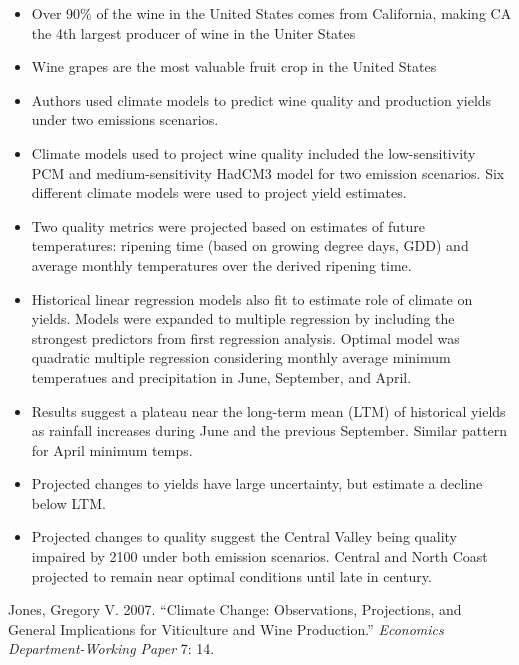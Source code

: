 \begin{itemize}
\tightlist
  \item
    Over 90\% of the wine in the United States comes from California, making CA the 4th largest producer of wine in the Uniter States
  \item
    Wine grapes are the most valuable fruit crop in the United States
  \item
    Authors used climate models to predict wine quality and production yields under two emissions scenarios. 
  \item
    Climate models used to project wine quality included the low-sensitivity PCM and medium-sensitivity HadCM3 model for two emission scenarios. Six different climate models were used to project yield estimates.
  \item
    Two quality metrics were projected based on estimates of future temperatures: ripening time (based on growing degree days, GDD) and average monthly temperatures over the derived ripening time.
  \item
    Historical linear regression models also fit to estimate role of climate on yields. Models were expanded to multiple regression by including the strongest predictors from first regression analysis. Optimal model was quadratic multiple regression considering monthly average minimum temperatues and precipitation in June, September, and April.
  \item
    Results suggest a plateau near the long-term mean (LTM) of historical yields as rainfall increases during June and the previous September. Similar pattern for April minimum temps.
  \item
    Projected changes to yields have large uncertainty, but estimate a decline below LTM.
  \item
    Projected changes to quality suggest the Central Valley being quality impaired by 2100 under both emission scenarios. Central and North Coast projected to remain near optimal conditions until late in century.
    
\end{itemize}

\hypertarget{ref-jones2007}{}
Jones, Gregory V. 2007. ``Climate Change: Observations, Projections, and
General Implications for Viticulture and Wine Production.''
\emph{Economics Department-Working Paper} 7: 14.

